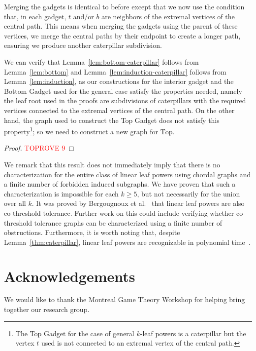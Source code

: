 \documentclass[11pt,letter]{article}
\theoremstyle{remark}
\newcommand{\T}{\text{Top}}
\begin{document}
Merging the gadgets is identical to before except that we now use the condition that, in each gadget, $t$ and/or $b$ are neighbors of the extremal vertices of the central path. This means when merging the gadgets using the parent of these vertices, we merge the central paths by their endpoint to create a longer path, ensuring we produce another caterpillar subdivision.

We can verify that Lemma~\ref{lem:bottom-caterpillar} follows from Lemma~\ref{lem:bottom} and Lemma~\ref{lem:induction-caterpillar} follows from Lemma~\ref{lem:induction}, as our constructions for the interior gadget and the Bottom Gadget used for the general case satisfy the properties needed, namely the leaf root used in the proofs are subdivisions of caterpillars with the required vertices connected to the extremal vertices of the central path. On the other hand, the graph used to construct the Top Gadget does not satisfy this property\footnote{The Top Gadget for the case of general $k$-leaf powers is a caterpillar but the vertex $t$ used is not connected to an extremal vertex of the central path.}; so we need to construct a new graph for $\T$.

\begin{proof}\textcolor{red}{TOPROVE 9}\end{proof}
We remark that this result does not immediately imply that there is no characterization for the entire class of linear leaf powers using chordal graphs and a finite number of forbidden induced subgraphs.
We have proven that such a characterization is impossible for each $k\geq 5$, but not necessarily for the union over all $k$. It was proved by Bergougnoux et al.~\cite{Bergougnoux} that linear leaf powers are also co-threshold tolerance. Further work on this could include verifying whether co-threshold tolerance graphs can be characterized using a finite number of obstructions.
Furthermore, it is worth noting that, despite Lemma~\ref{thm:caterpillar}, linear leaf powers are recognizable in polynomial time~\cite{Bergougnoux}. 

\section{Acknowledgements}

We would like to thank the Montreal Game Theory Workshop for helping bring together our research group.
\end{document}
